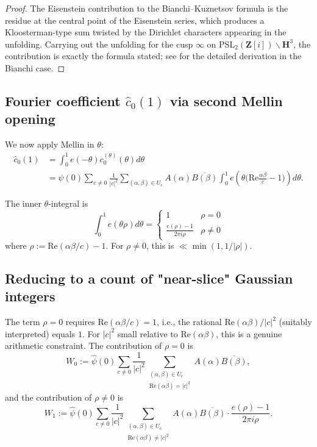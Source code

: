 \documentclass[11pt]{article}
\theoremstyle{definition}
\newcommand{\Z}{\mathbf{Z}}
\newcommand{\HH}{\mathbf{H}}
\newcommand{\Zi}{\Z[i]}
\renewcommand{\Re}{\mathrm{Re}}
\begin{document}
\begin{proof}
The Eisenstein contribution to the Bianchi--Kuznetsov formula is the residue at the central point of the Eisenstein series, which produces a Kloosterman-type sum twisted by the Dirichlet characters appearing in the unfolding. Carrying out the unfolding for the cusp $\infty$ on $\mathrm{PSL}_2(\Zi)\backslash\HH^3$, the contribution is exactly the formula stated; see \cite[§5]{LG} for the detailed derivation in the Bianchi case.
\end{proof}

\subsection{Fourier coefficient $\widehat c_0(1)$ via second Mellin opening}

We now apply Mellin in $\theta$:
\begin{align*}
\widehat c_0(1)&=\int_0^1 e(-\theta)c_0^{(\theta)}(\theta)d\theta\\
&=\widehat\psi(0)\sum_{c\ne 0}\frac{1}{|c|^2}\sum_{(\alpha,\beta)\in U_c}A(\alpha)\overline{B(\beta)}\int_0^1 e\!\left(\theta\Big(\Re\frac{\alpha\beta}{c}-1\Big)\right)d\theta.
\end{align*}

The inner $\theta$-integral is
\[
\int_0^1 e(\theta\rho)d\theta=\begin{cases}1&\rho=0\\ \frac{e(\rho)-1}{2\pi i\rho}&\rho\ne 0\end{cases}
\]
where $\rho:=\Re(\alpha\beta/c)-1$. For $\rho\ne 0$, this is $\ll \min(1,1/|\rho|)$.

\subsection{Reducing to a count of "near-slice" Gaussian integers}

The term $\rho=0$ requires $\Re(\alpha\beta/c)=1$, i.e., the rational $\Re(\alpha\beta)/|c|^2$ (suitably interpreted) equals $1$. For $|c|^2$ small relative to $\Re(\alpha\beta)$, this is a genuine arithmetic constraint. The contribution of $\rho=0$ is
\[
W_0:=\widehat\psi(0)\sum_{c\ne 0}\frac{1}{|c|^2}\sum_{\substack{(\alpha,\beta)\in U_c\\ \Re(\alpha\beta)=|c|^2}}A(\alpha)\overline{B(\beta)},
\]
and the contribution of $\rho\ne 0$ is
\[
W_1:=\widehat\psi(0)\sum_{c\ne 0}\frac{1}{|c|^2}\sum_{\substack{(\alpha,\beta)\in U_c\\ \Re(\alpha\beta)\ne |c|^2}}A(\alpha)\overline{B(\beta)}\cdot\frac{e(\rho)-1}{2\pi i\rho}.
\]
\end{document}
